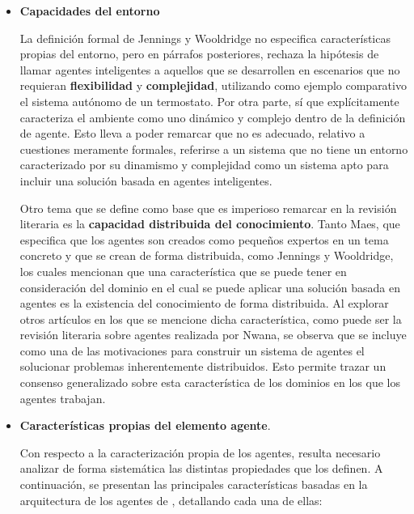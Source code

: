 \begin{itemize}

\item \textbf{Capacidades del entorno}

La definición formal de Jennings y Wooldridge no especifica características propias del entorno, pero en párrafos posteriores, rechaza la hipótesis de llamar agentes inteligentes a aquellos que se desarrollen en escenarios que no requieran \textbf{flexibilidad} y \textbf{complejidad}, utilizando como ejemplo comparativo el sistema autónomo de un termostato\cite{jennings1998applications}. Por otra parte, \textcite{maes1993modeling} sí que explícitamente caracteriza el ambiente como uno dinámico y complejo dentro de la definición de agente. Esto lleva a poder remarcar que no es adecuado, relativo a cuestiones meramente formales, referirse a un sistema que no tiene un entorno caracterizado por su dinamismo y complejidad como un sistema apto para incluir una solución basada en agentes inteligentes.

Otro tema que se define como base que es imperioso remarcar en la revisión literaria es la \textbf{capacidad distribuida del conocimiento}. Tanto Maes, que especifica que los agentes son creados como pequeños expertos en un tema concreto y que se crean de forma distribuida\cite{maes1993modeling}, como Jennings y Wooldridge, los cuales mencionan que una característica que se puede tener en consideración del dominio en el cual se puede aplicar una solución basada en agentes es la existencia del conocimiento de forma distribuida\cite{jennings1998applications}. Al explorar otros artículos en los que se mencione dicha característica, como puede ser la revisión literaria sobre agentes realizada por Nwana\cite{nwana1996software}, se observa que se incluye como una de las motivaciones para construir un sistema de agentes el solucionar problemas inherentemente distribuidos. Esto permite trazar un consenso generalizado sobre esta característica de los dominios en los que los agentes trabajan.

\item \textbf{Características propias del elemento agente}.

Con respecto a la caracterización propia de los agentes, resulta necesario analizar de forma sistemática las distintas propiedades que los definen. A continuación, se presentan las principales características basadas en la arquitectura de los agentes de \textcite{Wooldridge1995}, detallando cada una de ellas:

\begin{itemize}


\end{itemize}
\end{itemize}
